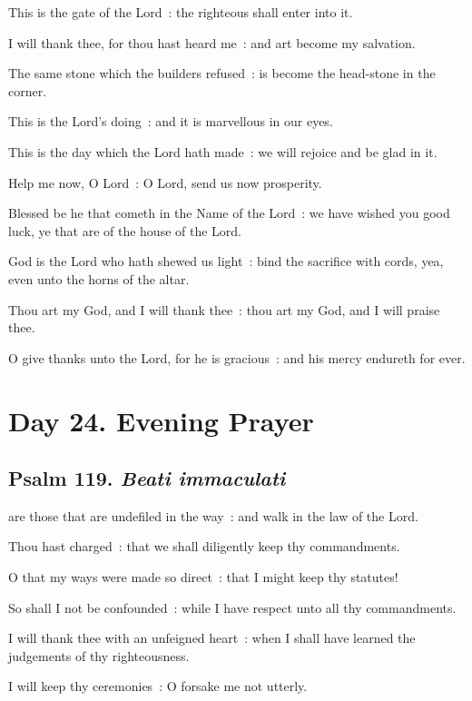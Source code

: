 This is the gate of the Lord~: the righteous shall enter into it.\par
{}I will thank thee, for thou hast heard me~: and art become my salvation.\par
{}The same stone which the builders refused~: is become the head-stone in the corner.\par
{}This is the Lord's doing~: and it is marvellous in our eyes.\par
{}This is the day which the Lord hath made~: we will rejoice and be glad in it.\par
{}Help me now, O Lord~: O Lord, send us now prosperity.\par
{}Blessed be he that cometh in the Name of the Lord~: we have wished you good luck, ye that are of the house of the Lord.\par
{}God is the Lord who hath shewed us light~: bind the sacrifice with cords, yea, even unto the horns of the altar.\par
{}Thou art my God, and I will thank thee~: thou art my God, and I will praise thee.\par
{}O give thanks unto the Lord, for he is gracious~: and his mercy endureth for ever.\par


\section*{Day 24. Evening Prayer}

\subsection{Psalm 119. \textit{Beati immaculati}}


 are those that are undefiled in the way~: and walk in the law of the Lord.\par
{}
Thou hast charged~: that we shall diligently keep thy commandments.\par
{}O that my ways were made so direct~: that I might keep thy statutes!\par
{}So shall I not be confounded~: while I have respect unto all thy commandments.\par
{}I will thank thee with an unfeigned heart~: when I shall have learned the judgements of thy righteousness.\par
{}I will keep thy ceremonies~: O forsake me not utterly.\par

